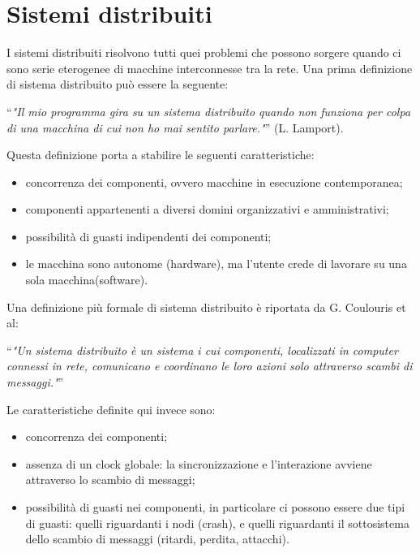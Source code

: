 \chapter{Sistemi distribuiti}
I sistemi distribuiti risolvono tutti quei problemi che possono sorgere quando ci sono serie eterogenee di macchine interconnesse tra la rete. Una prima definizione di sistema distribuito può essere la seguente:

\vspace{5mm}

\enquote{\textit{"Il mio programma gira su un sistema distribuito quando non funziona per colpa di una macchina di cui non ho mai sentito parlare."}} (L. Lamport).

\vspace{5mm}


Questa definizione porta a stabilire le seguenti caratteristiche:
\begin{itemize}
    \item concorrenza dei componenti, ovvero macchine in esecuzione contemporanea;
    \item componenti appartenenti a diversi domini organizzativi e amministrativi;
    \item possibilità di guasti indipendenti dei componenti;
    \item le macchina sono autonome (hardware), ma l'utente crede di lavorare su una sola macchina(software).
\end{itemize}

Una definizione più formale di sistema distribuito è riportata da G. Coulouris et al:

\vspace{5mm}

\enquote{\textit{"Un sistema distribuito è un sistema i cui componenti, localizzati in computer connessi in rete, comunicano e coordinano le loro azioni solo attraverso scambi di messaggi."}}


\vspace{5mm}

Le caratteristiche definite qui invece sono:
\begin{itemize}
    \item concorrenza dei componenti;
    \item assenza di un clock globale: la sincronizzazione e l'interazione avviene attraverso lo scambio di messaggi;
    \item possibilità di guasti nei componenti, in particolare ci possono essere due tipi di guasti: quelli riguardanti i nodi (crash), e quelli riguardanti il sottosistema dello scambio di messaggi (ritardi, perdita, attacchi).
\end{itemize}

